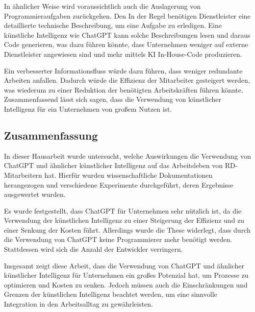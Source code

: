 In ähnlicher Weise wird voraussichtlich auch die Auslagerung von Programmieraufgaben zurückgehen. Den In der Regel benötigen Dienstleister eine detaillierte technische Beschreibung, um eine Aufgabe zu erledigen. Eine künstliche Intelligenz wie ChatGPT kann solche Beschreibungen lesen und daraus Code generieren, was dazu führen könnte, dass Unternehmen weniger auf externe Dienstleister angewiesen sind und mehr mittels KI In-House-Code produzieren.

Ein verbesserter Informationsfluss würde dazu führen, dass weniger redundante Arbeiten anfallen. Dadurch würde die Effizienz der Mitarbeiter gesteigert werden, was wiederum zu einer Reduktion der benötigten Arbeitskräften führen könnte.
Zusammenfassend lässt sich sagen, dass die Verwendung von künstlicher Intelligenz für ein Unternehmen von großem Nutzen ist.

\subsection{Zusammenfassung}
In dieser Hausarbeit wurde untersucht, welche Auswirkungen die Verwendung von ChatGPT und ähnlicher künstlicher Intelligenz auf das Arbeitsleben von RD-Mitarbeitern hat. Hierfür wurden wissenschaftliche Dokumentationen herangezogen und verschiedene Experimente durchgeführt, deren Ergebnisse ausgewertet wurden.

Es wurde festgestellt, dass ChatGPT für Unternehmen sehr nützlich ist, da die Verwendung der künstlichen Intelligenz zu einer Steigerung der Effizienz und zu einer Senkung der Kosten führt. Allerdings wurde die These widerlegt, dass durch die Verwendung von ChatGPT keine Programmierer mehr benötigt werden. Stattdessen wird sich die Anzahl der Entwickler verringern.

Insgesamt zeigt diese Arbeit, dass die Verwendung von ChatGPT und ähnlicher künstlicher Intelligenz für Unternehmen ein großes Potenzial hat, um Prozesse zu optimieren und Kosten zu senken. Jedoch müssen auch die Einschränkungen und Grenzen der künstlichen Intelligenz beachtet werden, um eine sinnvolle Integration in den Arbeitsalltag zu gewährleisten.